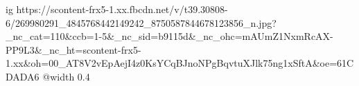  
 
 
 
 

\ifcmt
  ig https://scontent-frx5-1.xx.fbcdn.net/v/t39.30808-6/269980291_4845768442149242_8750587844678123856_n.jpg?_nc_cat=110&ccb=1-5&_nc_sid=b9115d&_nc_ohc=mAUmZ1NxmRcAX-PP9L3&_nc_ht=scontent-frx5-1.xx&oh=00_AT8V2vEpAejI4z0KsYCqBJnoNPgBqvtuXJlk75ng1xSftA&oe=61CDADA6
  @width 0.4
\fi
